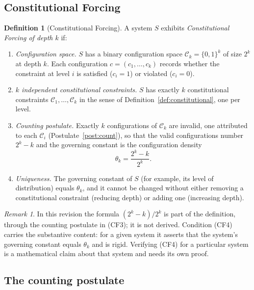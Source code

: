 \documentclass[12pt]{amsart}
\theoremstyle{plain}
\theoremstyle{definition}
\newtheorem{definition}[theorem]{Definition}
\theoremstyle{remark}
\newtheorem{remark}[theorem]{Remark}
\newcommand{\Ck}{\mathcal{C}_k}
\newcommand{\thetak}{\theta_k}
\begin{document}
\subsection{Constitutional Forcing}

\begin{definition}[Constitutional Forcing]
\label{def:CF}
A system $S$ exhibits \emph{Constitutional Forcing of depth $k$} if:
\begin{enumerate}[label=\textup{(CF\arabic*)}]
  \item \emph{Configuration space.} $S$ has a binary configuration space
    $\Ck = \{0,1\}^k$ of size $2^k$ at depth $k$. Each configuration
    $c = (c_1, \ldots, c_k)$ records whether the constraint at level $i$ is
    satisfied ($c_i = 1$) or violated ($c_i = 0$).
  \item \emph{$k$ independent constitutional constraints.} $S$ has exactly
    $k$ constitutional constraints $\mathcal{C}_1, \ldots, \mathcal{C}_k$
    in the sense of Definition~\ref{def:constitutional}, one per level.
  \item \emph{Counting postulate.} Exactly $k$ configurations of $\Ck$ are
    invalid, one attributed to each $\mathcal{C}_i$
    (Postulate~\ref{post:count}), so that the valid configurations number
    $2^k - k$ and the governing constant is the configuration density
    \begin{equation}
    \label{eq:theta}
      \thetak = \frac{2^k - k}{2^k}.
    \end{equation}
  \item \emph{Uniqueness.} The governing constant of $S$ (for example, its
    level of distribution) equals $\thetak$, and it cannot be changed without
    either removing a constitutional constraint (reducing depth) or adding one
    (increasing depth).
\end{enumerate}
\end{definition}

\begin{remark}
In this revision the formula $(2^k - k)/2^k$ is part of the definition,
through the counting postulate in (CF3); it is not derived. Condition (CF4)
carries the substantive content: for a given system it asserts that the
system's governing constant equals $\thetak$ and is rigid. Verifying (CF4) for
a particular system is a mathematical claim about that system and needs its
own proof.
\end{remark}

\subsection{The counting postulate}
\end{document}
